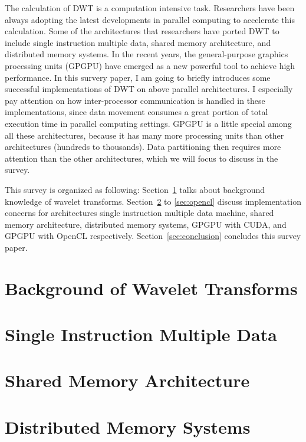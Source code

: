 \documentclass{article}
\begin{document}
The calculation of DWT is a computation intensive task.
%
Researchers have been always adopting the latest developments in 
parallel computing to accelerate this calculation.
%
Some of the architectures that researchers have ported DWT to
include single instruction multiple data, shared memory architecture,
and distributed memory systems.
%
In the recent years, the general-purpose graphics processing units
(GPGPU) have emerged as a new powerful tool to achieve high performance.
%
In this survery paper, I am going to briefly introduces some successful
implementations of DWT on above parallel architectures.
%
I especially pay attention on how inter-processor communication is handled
in these implementations, since data movement consumes a great portion 
of total execution time in parallel computing settings.
%
GPGPU is a little special among all these architectures, because it has 
many more processing units than other architectures (hundreds to thousands).
%
Data partitioning then requires more attention than the other architectures, 
which we will focus to discuss in the survey.


This survey is organized as following:
Section~\ref{sec:bg} talks about background knowledge of wavelet transforms.
%
Section~\ref{sec:simd} to \ref{sec:opencl} discuss implementation concerns for
architectures single instruction multiple data machine, shared memory architecture,
distributed memory systems, GPGPU with CUDA, and GPGPU with OpenCL respectively.
%
Section~\ref{sec:conclusion} concludes this survey paper.


\section{Background of Wavelet Transforms}
\label{sec:bg}


\section{Single Instruction Multiple Data}
\label{sec:simd}


\section{Shared Memory Architecture}
\label{sec:sma}


\section{Distributed Memory Systems}
\label{sec:dma}

\end{document}
